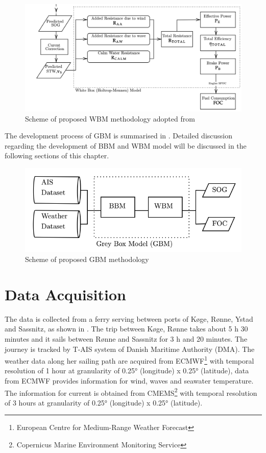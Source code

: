 \begin{figure}[h]
    \centering
        \includegraphics[width=\textwidth]{02_figures/flowmethod_WBM.png}
        \caption{Scheme of proposed WBM methodology adopted from }
        \label{fig:flowchart_WBM}
\end{figure}

The development process of GBM is summarised in . Detailed discussion regarding the development of BBM and WBM model will be discussed in the following sections of this chapter.

\begin{figure}[h]
    \centering
        \includegraphics[width=\textwidth]{02_figures/flowmethod_GBM.png}
        \caption{Scheme of proposed GBM methodology}
        \label{fig:flowchart_GBM}
\end{figure}


\section{Data Acquisition}\label{sec:data_acquisition}

The data is collected from a ferry serving between ports of K{\o}ge, R{\o}nne, Ystad and Sassnitz, as shown in  . The trip between K{\o}ge, R{\o}nne takes about 5 h 30 minutes and it sails between R{\o}nne and Sassnitz for 3 h and 20 minutes. The journey is tracked by T-AIS system of Danish Maritime Authority (DMA). The weather data along her sailing path are acquired from ECMWF\footnote{European Centre for Medium-Range Weather Forecast} with temporal resolution of 1 hour at granularity of 0.25° (longitude) x 0.25° (latitude), data from ECMWF provides information for wind, waves and seawater temperature. The information for current is obtained from CMEMS\footnote{Copernicus Marine Environment Monitoring Service} with temporal resolution of 3 hours at granularity of  0.25° (longitude) x 0.25° (latitude).\\ 

